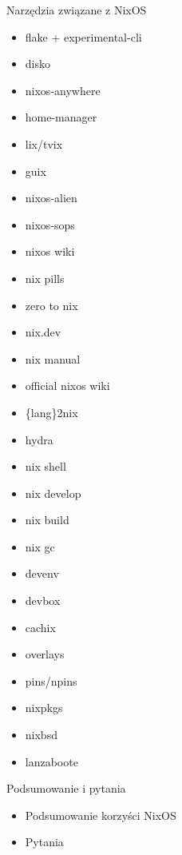 \documentclass{beamer}
\begin{document}
\begin{frame}{Narzędzia związane z NixOS}
    \begin{itemize}
        \item flake + experimental-cli
        \item disko
        \item nixos-anywhere
        \item home-manager
        \item lix/tvix
        \item guix
        \item nixos-alien
        \item nixos-sops
        \item nixos wiki
        \item nix pills
        \item zero to nix
        \item nix.dev
        \item nix manual
        \item official nixos wiki
        \item \{lang\}2nix
        \item hydra
        \item nix shell
        \item nix develop
        \item nix build
        \item nix gc
        \item devenv
        \item devbox
        \item cachix
        \item overlays
        \item pins/npins
        \item nixpkgs
        \item nixbsd
        \item lanzaboote
    \end{itemize}
\end{frame}

\begin{frame}{Podsumowanie i pytania}
    \begin{itemize}
        \item Podsumowanie korzyści NixOS
        \item Pytania
    \end{itemize}
\end{frame}
\end{document}
